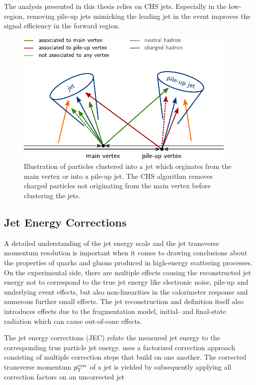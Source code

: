 The analysis presented in this thesis relies on CHS jets. Especially in the
low-\pt region, removing pile-up jets mimicking the leading jet in the event
improves the signal efficiency in the forward region.

\begin{figure}[htb]
    \centering
    \includegraphics[width=0.95\textwidth]{figures/jet_reconstruction/chs.pdf}
    \caption[Charged Hadron Subtraction]{Illustration of particles clustered
    into a jet which orginates from the main vertex or into a pile-up jet. The
    CHS algorithm removes charged particles not originating from the main vertex
    before clustering the jets.}
    \label{fig:chs_jets}
\end{figure}


\subsection{Jet Energy Corrections}
\label{sec:jec}

A detailed understanding of the jet energy scale and the jet transverse momentum
resolution is important when it comes to drawing conclusions about the
properties of quarks and gluons produced in high-energy scattering processes. On the
experimental side, there are multiple effects causing the reconstructed jet
energy not to correspond to the true jet energy like electronic noise, pile-up
and underlying event effects, but also non-linearities in the calorimeter
response and numerous further small effects. The jet reconstruction and
definition itself also introduces effects due to the fragmentation model,
initial- and final-state radiation which can cause out-of-cone effects.

The jet energy corrections (JEC) relate the measured jet energy to the
corresponding true particle jet energy. \CMS uses a factorized correction approach
consisting of multiple correction steps that build on one another. The corrected
transverse momentum $p_{\mathrm{T}}^{\mathrm{corr}}$ of a jet is yielded by subsequently applying all correction
factors on an uncorrected jet

